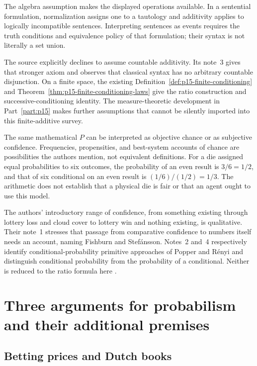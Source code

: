 The algebra assumption makes the displayed operations available. In a
sentential formulation, normalization assigns one to a tautology and
additivity applies to logically incompatible sentences. Interpreting
sentences as events requires the truth conditions and equivalence policy
of that formulation; their syntax is not literally a set union.

The source explicitly declines to assume countable additivity. Its note~3
gives that stronger axiom and observes that classical syntax has no
arbitrary countable disjunction. On a finite space, the existing
Definition~\ref{def:p15-finite-conditioning} and
Theorem~\ref{thm:p15-finite-conditioning-laws} give the ratio construction
and successive-conditioning identity. The measure-theoretic development
in Part~\ref{part:p15} makes further assumptions that cannot be silently
imported into this finite-additive survey.

The same mathematical \(P\) can be interpreted as objective chance or as
subjective confidence. Frequencies, propensities, and best-system accounts
of chance are possibilities the authors mention, not equivalent definitions.
For a die assigned equal probabilities to six outcomes, the probability
of an even result is \(3/6=1/2\), and that of six conditional on an even
result is \((1/6)/(1/2)=1/3\). The arithmetic does not establish that a
physical die is fair or that an agent ought to use this model.

The authors' introductory range of confidence, from something existing
through lottery loss and cloud cover to lottery win and nothing existing,
is qualitative. Their note~1 stresses that passage from comparative
confidence to numbers itself needs an account, naming Fishburn and
Stef\'ansson. Notes~2 and~4 respectively identify conditional-probability
primitive approaches of Popper and R\'enyi and distinguish conditional
probability from the probability of a conditional. Neither is reduced to
the ratio formula here
\parencite[pp.~239--240 and p.~248, nn.~1--4]{HajekStaffel2021Dynamics}.

\section{Three arguments for probabilism and their additional premises}
\label{sec:p15-rat41-probabilism-arguments}

\subsection{Betting prices and Dutch books}

